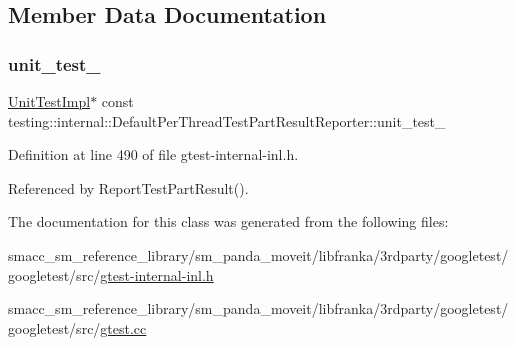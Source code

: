 \subsection{Member Data Documentation}
\mbox{\label{classtesting_1_1internal_1_1DefaultPerThreadTestPartResultReporter_a44f8ce831e79b6b25197ce8e4f2e08d6}} 
\subsubsection{\texorpdfstring{unit\+\_\+test\+\_\+}{unit\_test\_}}
{\footnotesize\ttfamily \hyperlink{classtesting_1_1internal_1_1UnitTestImpl}{Unit\+Test\+Impl}$\ast$ const testing\+::internal\+::\+Default\+Per\+Thread\+Test\+Part\+Result\+Reporter\+::unit\+\_\+test\+\_\+\hspace{0.3cm}{\ttfamily [private]}}



Definition at line 490 of file gtest-\/internal-\/inl.\+h.



Referenced by Report\+Test\+Part\+Result().



The documentation for this class was generated from the following files\+:\begin{DoxyCompactItemize}
\item 
smacc\+\_\+sm\+\_\+reference\+\_\+library/sm\+\_\+panda\+\_\+moveit/libfranka/3rdparty/googletest/googletest/src/\hyperlink{gtest-internal-inl_8h}{gtest-\/internal-\/inl.\+h}\item 
smacc\+\_\+sm\+\_\+reference\+\_\+library/sm\+\_\+panda\+\_\+moveit/libfranka/3rdparty/googletest/googletest/src/\hyperlink{gtest_8cc}{gtest.\+cc}\end{DoxyCompactItemize}
